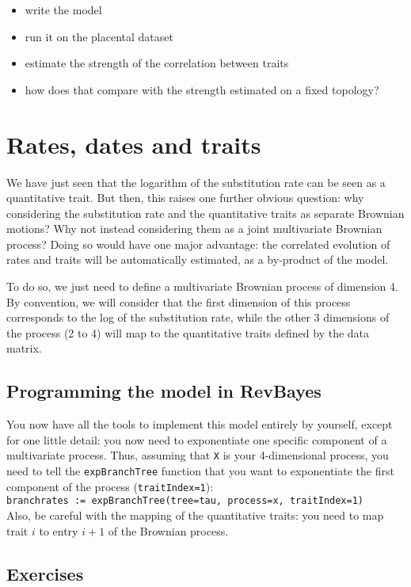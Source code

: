 \documentclass[usletter]{article}
\newcommand{\cmd}[1]{\texttt{#1}}
\begin{document}
\begin{itemize}
\item
write the model
\item
run it on the placental dataset
\item
estimate the strength of the correlation between traits
\item
how does that compare with the strength estimated on a fixed topology?
\end{itemize}

\section{Rates, dates and traits}

We have just seen that the logarithm of the substitution rate can be seen as a quantitative trait. But then, this raises one further obvious question: why considering the substitution rate and the quantitative traits as separate Brownian motions? Why not instead considering them as a joint multivariate Brownian process? Doing so would have one major advantage: the correlated evolution of rates and traits will be automatically estimated, as a by-product of the model.

To do so, we just need to define a multivariate Brownian process of dimension 4.
By convention, we will consider that the first dimension of this process
corresponds to the log of the substitution rate,
while the other 3 dimensions of the process (2 to 4) will map to the quantitative traits defined by the data matrix.

\subsection*{Programming the model in RevBayes}

You now have all the tools to implement this model entirely by yourself, except for one little detail: you now need to exponentiate one specific component of a multivariate process. Thus, assuming that \cmd{X} is your 4-dimensional process, you need to tell the \cmd{expBranchTree} function that you want to exponentiate the first component of the process (\cmd{traitIndex=1}):
\\
\cmd{branchrates := expBranchTree(tree=tau, process=x, traitIndex=1)}
\\
Also, be careful with the mapping of the quantitative traits: you need to map trait $i$ to entry $i+1$ of the Brownian process.


\subsection*{Exercises}
\end{document}
